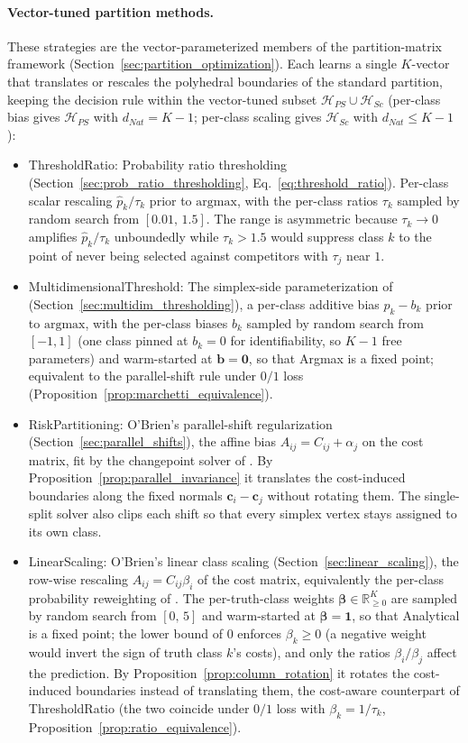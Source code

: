 \paragraph{Vector-tuned partition methods.} These strategies are the vector-parameterized members of the partition-matrix framework (Section~\ref{sec:partition_optimization}). Each learns a single $K$-vector that translates or rescales the polyhedral boundaries of the standard partition, keeping the decision rule within the vector-tuned subset $\mathcal{H}_{PS} \cup \mathcal{H}_{Sc}$ (per-class bias gives $\mathcal{H}_{PS}$ with $d_{Nat} = K-1$; per-class scaling gives $\mathcal{H}_{Sc}$ with $d_{Nat} \leq K-1$):
\begin{itemize}
    \item ThresholdRatio: Probability ratio thresholding (Section~\ref{sec:prob_ratio_thresholding}, Eq.~\ref{eq:threshold_ratio}). Per-class scalar rescaling $\hat{p}_k / \tau_k$ prior to $\mathrm{argmax}$, with the per-class ratios $\tau_k$ sampled by random search from $[0.01,\, 1.5]$. The range is asymmetric because $\tau_k \to 0$ amplifies $\hat{p}_k/\tau_k$ unboundedly while $\tau_k > 1.5$ would suppress class $k$ to the point of never being selected against competitors with $\tau_j$ near $1$.
    \item MultidimensionalThreshold: The simplex-side parameterization of \citet{legnaro2025multiclass} (Section~\ref{sec:multidim_thresholding}), a per-class additive bias $\hat{p}_k - b_k$ prior to $\mathrm{argmax}$, with the per-class biases $b_k$ sampled by random search from $[-1, 1]$ (one class pinned at $b_k = 0$ for identifiability, so $K-1$ free parameters) and warm-started at $\mathbf{b} = \mathbf{0}$, so that Argmax is a fixed point; equivalent to the parallel-shift rule under $0/1$ loss (Proposition~\ref{prop:marchetti_equivalence}).
    \item RiskPartitioning: O'Brien's parallel-shift regularization (Section~\ref{sec:parallel_shifts}), the affine bias $A_{ij} = C_{ij} + \alpha_j$ on the cost matrix, fit by the changepoint solver of \citet{obrien2008costsensitive}. By Proposition~\ref{prop:parallel_invariance} it translates the cost-induced boundaries along the fixed normals $\mathbf{c}_i - \mathbf{c}_j$ without rotating them. The single-split solver also clips each shift so that every simplex vertex stays assigned to its own class.
    \item LinearScaling: O'Brien's linear class scaling (Section~\ref{sec:linear_scaling}), the row-wise rescaling $A_{ij} = C_{ij}\beta_i$ of the cost matrix, equivalently the per-class probability reweighting of \citet{lachiche2003improving}. The per-truth-class weights $\boldsymbol{\beta} \in \mathbb{R}^K_{\ge 0}$ are sampled by random search from $[0,\, 5]$ and warm-started at $\boldsymbol{\beta} = \mathbf{1}$, so that Analytical is a fixed point; the lower bound of $0$ enforces $\beta_k \ge 0$ (a negative weight would invert the sign of truth class $k$'s costs), and only the ratios $\beta_i/\beta_j$ affect the prediction. By Proposition~\ref{prop:column_rotation} it rotates the cost-induced boundaries instead of translating them, the cost-aware counterpart of ThresholdRatio (the two coincide under $0/1$ loss with $\beta_k = 1/\tau_k$, Proposition~\ref{prop:ratio_equivalence}).

\end{itemize}
